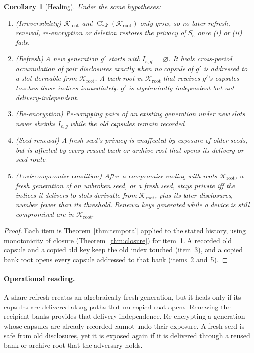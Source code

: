 \documentclass[pdflatex,sn-mathphys-num,twocolumn]{sn-jnl}
\theoremstyle{plain}
\newtheorem{corollary}[theorem]{Corollary}
\theoremstyle{definition}
\newcommand{\Cl}{\operatorname{Cl}}
\begin{document}
\begin{corollary}[Healing]\label{cor:healing}
Under the same hypotheses:
\begin{enumerate}
\item (Irreversibility) $\mathcal K_{\mathrm{root}}$ and $\Cl_{\mathcal R}(\mathcal K_{\mathrm{root}})$ only grow, so no later refresh, renewal, re-encryption or deletion restores the privacy of $S_e$ once (i) or (ii) fails.
\item (Refresh) A new generation $g'$ starts with $I_{e,g'}=\varnothing$. It heals cross-period accumulation of pair disclosures exactly when no capsule of $g'$ is addressed to a slot derivable from $\mathcal K_{\mathrm{root}}$. A bank root in $\mathcal K_{\mathrm{root}}$ that receives $g'$'s capsules touches those indices immediately: $g'$ is algebraically independent but not delivery-independent.
\item (Re-encryption) Re-wrapping pairs of an existing generation under new slots never shrinks $I_{e,g}$ while the old capsules remain recorded.
\item (Seed renewal) A fresh seed's privacy is unaffected by exposure of older seeds, but is affected by every reused bank or archive root that opens its delivery or seed route.
\item (Post-compromise condition) After a compromise ending with roots $\mathcal K_{\mathrm{root}}$, a fresh generation of an unbroken seed, or a fresh seed, stays private iff the indices it delivers to slots derivable from $\mathcal K_{\mathrm{root}}$, plus its later disclosures, number fewer than its threshold. Renewal keys generated while a device is still compromised are in $\mathcal K_{\mathrm{root}}$.
\end{enumerate}
\end{corollary}
\begin{proof}
Each item is Theorem~\ref{thm:temporal} applied to the stated history, using monotonicity of closure (Theorem~\ref{thm:closure}) for item~1. A recorded old capsule and a copied old key keep the old index touched (item~3), and a copied bank root opens every capsule addressed to that bank (items~2 and~5).
\end{proof}

\paragraph{Operational reading.}
A share refresh creates an algebraically fresh generation, but it heals only if its capsules are delivered along paths that no copied root opens. Renewing the recipient banks provides that delivery independence. Re-encrypting a generation whose capsules are already recorded cannot undo their exposure. A fresh seed is safe from old disclosures, yet it is exposed again if it is delivered through a reused bank or archive root that the adversary holds.
\end{document}
